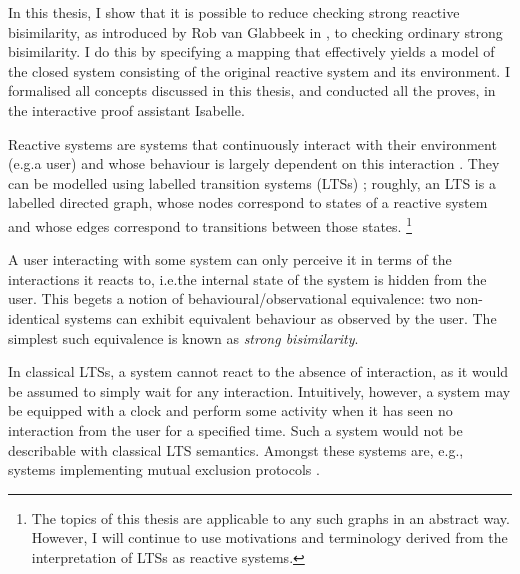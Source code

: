 %
\begin{isabellebody}%
%
%
\isadelimtheory
%
\endisadelimtheory
%
\isatagtheory
%
\endisatagtheory
{\isafoldtheory}%
%
\isadelimtheory
%
\endisadelimtheory
%
\isadelimdocument
%
\endisadelimdocument
%
\isatagdocument
%
\isamarkuptrue%
%
\endisatagdocument
{\isafolddocument}%
%
\isadelimdocument
%
\endisadelimdocument
%
\begin{isamarkuptext}%
\label{chap:introduction}%
\end{isamarkuptext}\isamarkuptrue%
%
\begin{isamarkuptext}%
In this thesis, I show that it is possible to reduce checking strong reactive bisimilarity, as introduced by Rob van Glabbeek in \cite{rbs}, to checking ordinary strong bisimilarity. I do this by specifying a mapping that effectively yields a model of the closed system consisting of the original reactive system and its environment. 
I formalised all concepts discussed in this thesis, and conducted all the proves, in the interactive proof assistant Isabelle.

Reactive systems are systems that continuously interact with their environment (e.g.\@ a user) and whose behaviour is largely dependent on this interaction \cite{harel85}.
They can be modelled using labelled transition systems (LTSs) \cite{keller76}; roughly, an LTS is a labelled directed graph, whose nodes correspond to states of a reactive system and whose edges correspond to transitions between those states.%
\footnote{The topics of this thesis are applicable to any such graphs in an abstract way. However, I will continue to use motivations and terminology derived from the interpretation of LTSs as reactive systems.}

A user interacting with some system can only perceive it in terms of the interactions it reacts to, i.e.\@ the internal state of the system is hidden from the user. This begets a notion of behavioural/observational equivalence: two non-identical systems can exhibit equivalent behaviour as observed by the user. The simplest such equivalence is known as \emph{strong bisimilarity}.

In classical LTSs, a system cannot react to the absence of interaction, as it would be assumed to simply wait for any interaction. Intuitively, however, a system may be equipped with a clock and perform some activity when it has seen no interaction from the user for a specified time. Such a system would not be describable with classical LTS semantics. Amongst these systems are, e.g., systems implementing mutual exclusion protocols \cite{rbs}.


\end{isamarkuptext}
\end{isabellebody}
